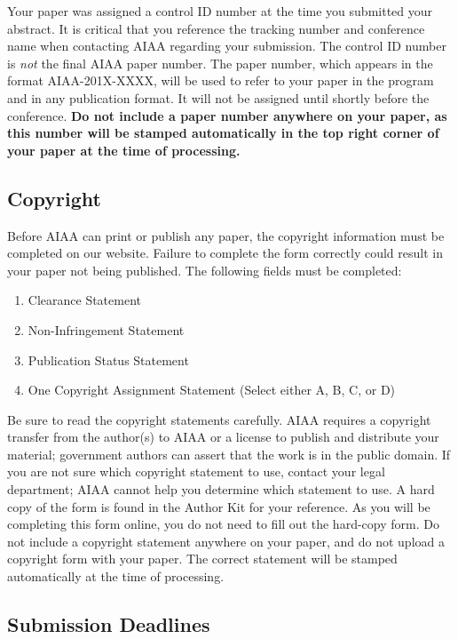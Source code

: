 \documentclass[conf]{new-aiaa}
\begin{document}
Your paper was assigned a control ID number at the time you submitted your abstract. It is critical that you reference the tracking number and conference name when contacting AIAA regarding your submission. The control ID number is \emph{not} the final AIAA paper number. The paper number, which appears in the format AIAA-201X-XXXX, will be used to refer to your paper in the program and in any publication format. It will not be assigned until shortly before the conference. \textbf{Do not include a paper number anywhere on your paper, as this number will be stamped automatically in the top right corner of your paper at the time of processing.}

\subsection{Copyright}

Before AIAA can print or publish any paper, the copyright information must be completed on our website. Failure to complete the form correctly could result in your paper not being published. The following fields must be completed:

\begin{enumerate}
\item Clearance Statement
\item Non-Infringement Statement
\item Publication Status Statement
\item One Copyright Assignment Statement (Select either A, B, C, or D)
\end{enumerate}

Be sure to read the copyright statements carefully. AIAA requires a copyright transfer from the author(s) to AIAA or a license to publish and distribute your material; government authors can assert that the work is in the public domain. If you are not sure which copyright statement to use, contact your legal department; AIAA cannot help you determine which statement to use. A hard copy of the form is found in the Author Kit for your reference. As you will be completing this form online, you do not need to fill out the hard-copy form. Do not include a copyright statement anywhere on your paper, and do not upload a copyright form with your paper. The correct statement will be stamped automatically at the time of processing.

\subsection{Submission Deadlines}
\end{document}
